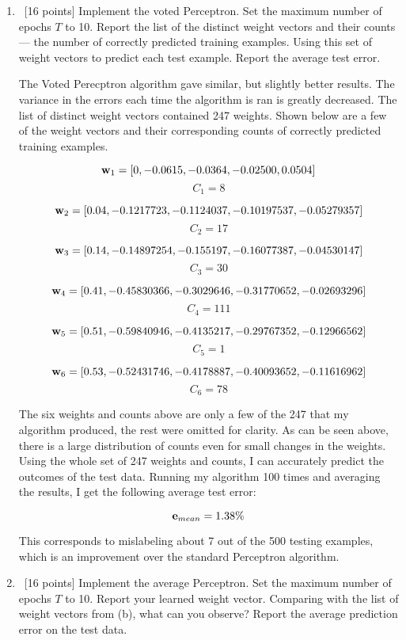 \documentclass[12pt, fullpage,letterpaper]{article}
\begin{document}
\begin{enumerate}
\begin{enumerate}
	
	
	\item~[16 points] Implement the voted Perceptron. Set the maximum number of epochs $T$ to 10. Report the list of the distinct weight vectors and their counts --- the number of correctly predicted training examples. Using this set of weight vectors to predict each test example. Report the average test error. 
	
	The Voted Perecptron algorithm gave similar, but slightly better results. The variance in the errors each time the algorithm is ran is greatly decreased. The list of distinct weight vectors contained 247 weights. Shown below are a few of the weight vectors and their corresponding counts of correctly predicted training examples.
	
	\[
		{\bf w}_1 = [0, -0.0615,  -0.0364,  -0.02500,  0.0504]
	\]
	\[
		C_1 = 8
	\]
	
	\[
		{\bf w}_2 = [0.04,       -0.1217723,  -0.1124037,  -0.10197537, -0.05279357]
	\]
	\[
		C_2 = 17
	\]
	
	\[
		{\bf w}_3 = [ 0.14,       -0.14897254, -0.155197,   -0.16077387, -0.04530147]
	\]
	\[
		C_3 = 30
	\]
	
	\[
		{\bf w}_4 = [0.41,       -0.45830366, -0.3029646,  -0.31770652, -0.02693296]
	\]
	\[
		C_4 = 111
	\]
	
	\[
		{\bf w}_5 = [0.51,       -0.59840946, -0.4135217,  -0.29767352, -0.12966562]
	\]
	\[
		C_5 = 1
	\]
	
	\[
		{\bf w}_6 = [0.53,       -0.52431746, -0.4178887,  -0.40093652, -0.11616962]
	\]
	\[
		C_6 = 78
	\]
	
	The six weights and counts above are only a few of the 247 that my algorithm produced, the rest were omitted for clarity. As can be seen above, there is a large distribution of counts even for small changes in the weights. Using the whole set of 247 weights and counts, I can accurately predict the outcomes of the test data. Running my algorithm 100 times and averaging the results, I get the following  average test error:
	
	 \[
		{\bf e}_{mean} = 1.38\%
	\]
	
	This corresponds to mislabeling about 7 out of the 500 testing examples, which is an improvement over the standard Perceptron algorithm. 
	

	
	
	\item~[16 points] Implement the average Perceptron. Set the maximum number of epochs $T$ to 10. Report your learned weight vector. Comparing with the list of weight vectors from (b), what can you observe? Report the average prediction error on the test data. 


\end{enumerate}
\end{enumerate}
\end{document}
